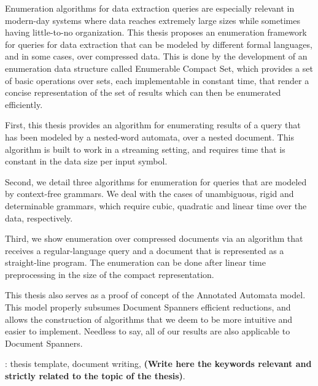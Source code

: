 \noindent Enumeration algorithms for data extraction queries are especially relevant in modern-day systems where data reaches extremely large sizes while sometimes having little-to-no organization.
This thesis proposes an enumeration framework for queries for data extraction that can be modeled by different formal languages, and in some cases, over compressed data. This is done by the development of an enumeration data structure called Enumerable Compact Set, which provides a set of basic operations over sets, each implementable in constant time, that render a concise representation of the set of results which can then be enumerated efficiently.

\noindent First, this thesis provides an algorithm for enumerating results of a query that has been modeled by a nested-word automata, over a nested document. This algorithm is built to work in a streaming setting, and requires time that is constant in the data size per input symbol.

\noindent Second, we detail three algorithms for enumeration for queries that are modeled by context-free grammars. We deal with the cases of unambiguous, rigid and determinable grammars, which require cubic, quadratic and linear time over the data, respectively.

\noindent Third, we show enumeration over compressed documents via an algorithm that receives a regular-language query and a document that is represented as a straight-line program. The enumeration can be done after linear time preprocessing in the size of the compact representation.

\noindent This thesis also serves as a proof of concept of the Annotated Automata model. This model properly subsumes Document Spanners efficient reductions, and allows the construction of algorithms that we deem to be more intuitive and easier to implement. Needless to say, all of our results are also applicable to Document Spanners.

\vfill
{}:  thesis template, document writing, {\bf (Write here the keywords relevant and strictly related to the topic of the thesis)}.
